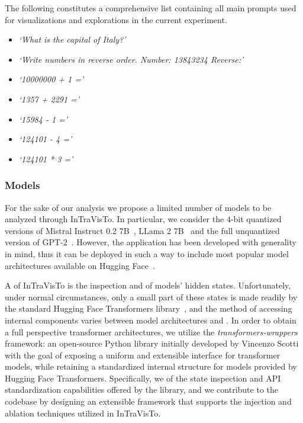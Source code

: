 The following constitutes a comprehensive list containing all main prompts used for visualizations and explorations in the current experiment.

\begin{multicols}{2}
    \begin{itemize}
        \item \emph{`What is the capital of Italy?'}
        \item \emph{`Write numbers in reverse order. Number: 13843234 Reverse:'}
        \item \emph{`10000000 + 1 ='}
        \item \emph{`1357 + 2291 ='}
        \item \emph{`15984 - 1 ='}
        \item \emph{`124101 - 4 ='}
        \item \emph{`124101 * 3 ='}
    \end{itemize}
\end{multicols}

\subsubsection{Models}

For the sake of our analysis we propose a limited number of models to be analyzed through InTraVisTo.
In particular, we consider the $4$-bit quantized versions of Mistral Instruct 0.2 7B~\cite{jiang2023}, LLama 2 7B~\cite{touvron2023} and the full unquantized version of GPT-2~\cite{radford2019}.
However, the application has been developed with generality in mind, thus it can be deployed in such a way to include most popular model architectures available on Hugging Face~\cite{wolf2020}.

A  of InTraVisTo is the inspection and  of models' hidden states.
Unfortunately, under normal circumstances, only a small part of these states is made readily  by the standard Hugging Face Transformers library~\cite{wolf2020}, and the method of accessing internal components varies between model architectures and .
In order to obtain a full perspective  transformer architectures, we utilize the \emph{transformers-wrappers} framework\footnotemark: an open-source Python library initially developed by Vincenzo Scotti with the goal of exposing a uniform and extensible interface for transformer models, while retaining a standardized internal structure for models provided by Hugging Face Transformers.
Specifically, we  of the state inspection and API standardization capabilities offered by the library, and we contribute to the codebase by designing an extensible framework that supports the injection and ablation techniques utilized in InTraVisTo.

